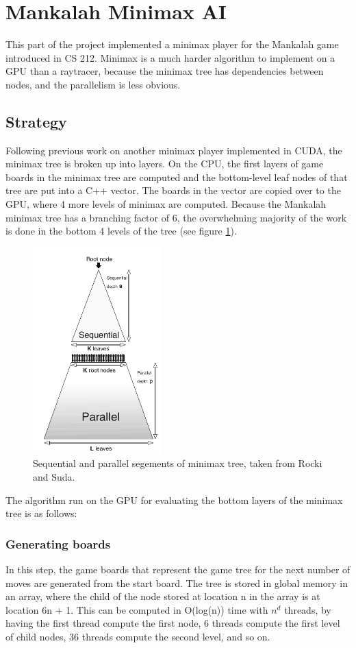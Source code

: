 \documentclass{article}
\begin{document}
\section{Mankalah Minimax AI}
This part of the project implemented a minimax player for the Mankalah game introduced in CS 212. Minimax is a much harder algorithm to implement on a GPU than a raytracer, because the minimax tree has dependencies between nodes, and the parallelism is less obvious.

\subsection{Strategy}
Following previous work on another minimax player implemented in CUDA\cite{rockisuda10}, the minimax tree is broken up into layers. On the CPU, the first layers of game boards in the minimax tree are computed and the bottom-level leaf nodes of that tree are put into a C++ vector. The boards in the vector are copied over to the GPU, where 4 more levels of minimax are computed. Because the Mankalah minimax tree has a branching factor of 6, the overwhelming majority of the work is done in the bottom 4 levels of the tree (see figure \ref{fig:minimaxdiagram}).

\begin{figure}[ht!]
\centering
\includegraphics[width=50mm]{minimax-diagram.png}
\caption{Sequential and parallel segements of minimax tree, taken from Rocki and Suda\cite{rockisuda10}.}
\label{fig:minimaxdiagram}
\end{figure}

The algorithm run on the GPU for evaluating the bottom layers of the minimax tree is as follows:

\subsubsection{Generating boards}
In this step, the game boards that represent the game tree for the next number of moves are generated from the start board. The tree is stored in global memory in an array, where the child of the node stored at location n in the array is at location 6n + 1. This can be computed in O(log(n)) time with $n^{d}$ threads, by having the first thread compute the first node, 6 threads compute the first level of child nodes, 36 threads compute the second level, and so on.
\end{document}
